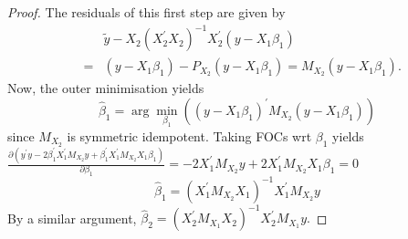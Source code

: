 \documentclass[notes=show]{beamer}
\begin{document}
\begin{frame}%

\begin{proof}
The residuals of this first step are given by%
\begin{eqnarray*}
&&\tilde{y}-X_{2}\left( X_{2}^{\prime }X_{2}\right) ^{-1}X_{2}^{\prime
}\left( y-X_{1}\beta _{1}\right) \\
&=&\left( y-X_{1}\beta _{1}\right) -P_{X_{2}}\left( y-X_{1}\beta _{1}\right)
=M_{X_{2}}\left( y-X_{1}\beta _{1}\right) .
\end{eqnarray*}
Now, the outer minimisation yields 
\begin{equation*}
\widehat{\beta }_{1}=\arg \min_{\beta _{1}}\left( \left( y-X_{1}\beta
_{1}\right) ^{\prime }M_{X_{2}}\left( y-X_{1}\beta _{1}\right) \right)
\end{equation*}%
since $M_{X_{2}}$ is symmetric idempotent. Taking FOCs wrt $\beta _{1}$
yields $\frac{\partial \left( y^{\prime }y-2\beta _{1}^{\prime
}X_{1}^{\prime }M_{X_{2}}y+\beta _{1}^{\prime }X_{1}^{\prime
}M_{X_{2}}X_{1}\beta _{1}\right) }{\partial \beta _{1}}=-2X_{1}^{\prime
}M_{X_{2}}y+2X_{1}^{\prime }M_{X_{2}}X_{1}\beta _{1}=0$ 
\begin{equation*}
\widehat{\beta }_{1}=\left( X_{1}^{\prime }M_{X_{2}}X_{1}\right)
^{-1}X_{1}^{\prime }M_{X_{2}}y
\end{equation*}%
By a similar argument, $\widehat{\beta }_{2}=\left( X_{2}^{\prime
}M_{X_{1}}X_{2}\right) ^{-1}X_{2}^{\prime }M_{X_{1}}y.$
\end{proof}

\end{frame}%
\end{document}
